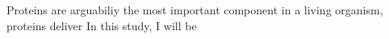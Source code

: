 Proteins are arguabiliy the most important component in a living organism, proteins deliver    In this study, I will be 
